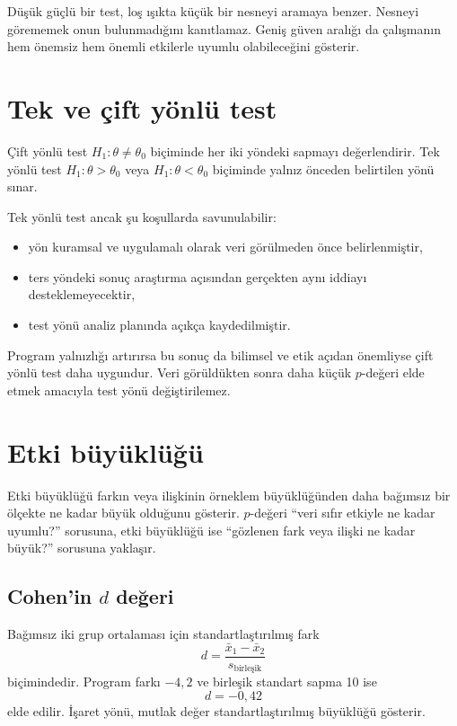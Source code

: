 \begin{sezgibox}
Düşük güçlü bir test, loş ışıkta küçük bir nesneyi aramaya benzer. Nesneyi
görememek onun bulunmadığını kanıtlamaz. Geniş güven aralığı da çalışmanın hem
önemsiz hem önemli etkilerle uyumlu olabileceğini gösterir.
\end{sezgibox}

\section{Tek ve çift yönlü test}

Çift yönlü test $H_1:\theta\neq\theta_0$ biçiminde her iki yöndeki sapmayı
değerlendirir. Tek yönlü test $H_1:\theta>\theta_0$ veya
$H_1:\theta<\theta_0$ biçiminde yalnız önceden belirtilen yönü sınar.

Tek yönlü test ancak şu koşullarda savunulabilir:

\begin{itemize}
  \item yön kuramsal ve uygulamalı olarak veri görülmeden önce belirlenmiştir,
  \item ters yöndeki sonuç araştırma açısından gerçekten aynı iddiayı desteklemeyecektir,
  \item test yönü analiz planında açıkça kaydedilmiştir.
\end{itemize}

Program yalnızlığı artırırsa bu sonuç da bilimsel ve etik açıdan önemliyse
çift yönlü test daha uygundur. Veri görüldükten sonra daha küçük $p$-değeri
elde etmek amacıyla test yönü değiştirilemez.

\section{Etki büyüklüğü}

Etki büyüklüğü farkın veya ilişkinin örneklem büyüklüğünden daha bağımsız bir
ölçekte ne kadar büyük olduğunu gösterir. $p$-değeri ``veri sıfır etkiyle ne
kadar uyumlu?'' sorusuna, etki büyüklüğü ise ``gözlenen fark veya ilişki ne
kadar büyük?'' sorusuna yaklaşır.

\subsection{Cohen'in $d$ değeri}

Bağımsız iki grup ortalaması için standartlaştırılmış fark
\[
d=\frac{\bar x_1-\bar x_2}{s_{\text{birleşik}}}
\]
biçimindedir. Program farkı $-4{,}2$ ve birleşik standart sapma 10 ise
\[
d=-0{,}42
\]
elde edilir. İşaret yönü, mutlak değer standartlaştırılmış büyüklüğü gösterir.

